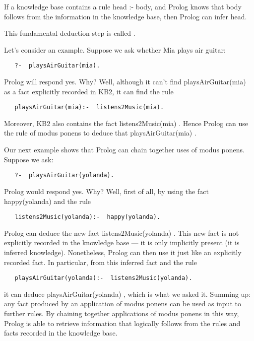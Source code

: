 If a knowledge base contains a rule head  :-  body, and Prolog knows that body
follows from the information in the knowledge base, then Prolog can infer head.

This fundamental deduction step is called .

Let’s consider an example. Suppose we ask whether Mia plays air guitar:

\begin{verbatim} 
   ?-  playsAirGuitar(mia).
\end{verbatim}
Prolog will respond yes. Why? Well, although it can’t find playsAirGuitar(mia)
as a fact explicitly recorded in KB2, it can find the rule

\begin{verbatim} 
   playsAirGuitar(mia):-  listens2Music(mia).
\end{verbatim}
   
Moreover, KB2 also contains the fact listens2Music(mia) . Hence Prolog can use
the rule of modus ponens to deduce that playsAirGuitar(mia) .

Our next example shows that Prolog can chain together uses of modus ponens.
Suppose we ask:

\begin{verbatim} 
   ?-  playsAirGuitar(yolanda).
\end{verbatim}
Prolog would respond yes. Why? Well, first of all, by using the fact
happy(yolanda) and the rule

\begin{verbatim} 
   listens2Music(yolanda):-  happy(yolanda).
\end{verbatim}
Prolog can deduce the new fact listens2Music(yolanda) . This new fact is not
explicitly recorded in the knowledge base — it is only implicitly present (it is
inferred knowledge). Nonetheless, Prolog can then use it just like an explicitly
recorded fact. In particular, from this inferred fact and the rule

\begin{verbatim} 
   playsAirGuitar(yolanda):-  listens2Music(yolanda).
\end{verbatim}
   
it can deduce playsAirGuitar(yolanda) , which is what we asked it. Summing up:
   any fact produced by an application of modus ponens can be used as input to
   further rules. By chaining together applications of modus ponens in this way,
   Prolog is able to retrieve information that logically follows from the rules
   and facts recorded in the knowledge base.
   
